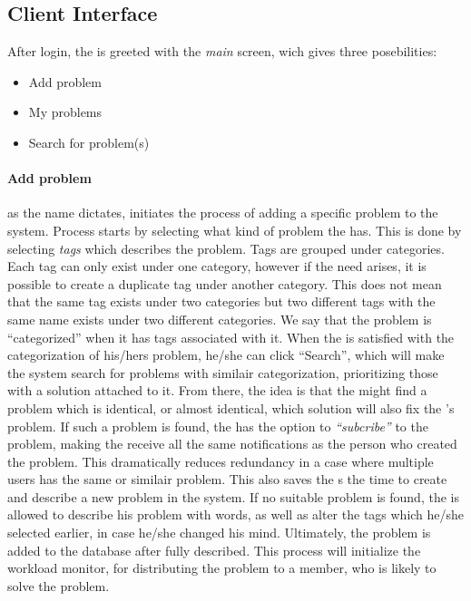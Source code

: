 \subsection{Client Interface}
\label{sec:client_interface}

After login, the \aclient[] is greeted with the \textit{main} screen, wich gives three posebilities:
\begin{itemize}
	\item Add problem
	\item My problems
	\item Search for problem(s)
\end{itemize}

\paragraph{Add problem}as the name dictates, initiates the process of adding a specific problem to the system. Process starts by selecting what kind of problem the \aclient[] has. This is done by selecting \textit{tags} which describes the problem. Tags are grouped under categories. Each tag can only exist under one category, however if the need arises, it is possible to create a duplicate tag under another category. This does not mean that the same tag exists under two categories but two different tags with the same name exists under two different categories. We say that the problem is ``categorized'' when it has tags associated with it.
When the \aclient[] is satisfied with the categorization of his/hers problem, he/she can click ``Search'', which will make the system search for problems with similair categorization, prioritizing those with a solution attached to it.
From there, the idea is that the \aclient[] might find a problem which is identical, or almost identical, which solution will also fix the \aclient 's problem. If such a problem is found, the \aclient[] has the option to \textit{``subcribe''} to the problem, making the \aclient[] receive all the same notifications as the person who created the problem. This dramatically reduces redundancy in a case where multiple users has the same or similair problem. This also saves the \aclient s the time to create and describe a new problem in the system.
If no suitable problem is found, the \aclient[] is allowed to describe his problem with words, as well as alter the tags which he/she selected earlier, in case he/she changed his mind. Ultimately, the problem is added to the database after fully described. This process will initialize the workload monitor, for distributing the problem to a \astaff[] member, who is likely to solve the problem.

